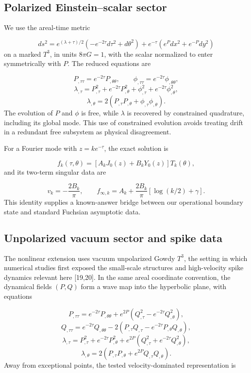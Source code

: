 \documentclass{iopjournal}
\begin{document}
\subsection{Polarized Einstein--scalar sector}
We use the areal-time metric

\[
ds^2=e^{(\lambda+\tau)/2}
(-e^{-2\tau}d\tau^2+d\theta^2)
+e^{-\tau}(e^Pdx^2+e^{-P}dy^2)
\]
on a marked $T^3$, in units $8\pi G=1$, with the scalar normalized to enter symmetrically with $P$. The reduced equations are

\[
P_{,\tau\tau}=e^{-2\tau}P_{,\theta\theta},
\qquad
\phi_{,\tau\tau}=e^{-2\tau}\phi_{,\theta\theta},
\]
\[
\lambda_{,\tau}=P_{,\tau}^2+e^{-2\tau}P_{,\theta}^2
+\phi_{,\tau}^2+e^{-2\tau}\phi_{,\theta}^2,
\]
\[
\lambda_{,\theta}
=2(P_{,\tau}P_{,\theta}+\phi_{,\tau}\phi_{,\theta}).
\]
The evolution of $P$ and $\phi$ is free, while $\lambda$ is recovered by constrained quadrature, including its global mode. This use of constrained evolution avoids treating drift in a redundant free subsystem as physical disagreement.

For a Fourier mode with $z=ke^{-\tau}$, the exact solution is

\[
f_k(\tau,\theta)=
[A_kJ_0(z)+B_kY_0(z)]T_k(\theta),
\]
and its two-term singular data are

\[
v_k=-\frac{2B_k}{\pi},
\qquad
f_{\infty,k}=A_k+\frac{2B_k}{\pi}
[\log(k/2)+\gamma].
\]
This identity supplies a known-answer bridge between our operational boundary state and standard Fuchsian asymptotic data.

\subsection{Unpolarized vacuum sector and spike data}
The nonlinear extension uses vacuum unpolarized Gowdy $T^3$, the setting in which numerical studies first exposed the small-scale structures and high-velocity spike dynamics relevant here [19,20]. In the same areal coordinate convention, the dynamical fields $(P,Q)$ form a wave map into the hyperbolic plane, with equations

\[
P_{,\tau\tau}=e^{-2\tau}P_{,\theta\theta}
+e^{2P}\left(Q_{,\tau}^2-e^{-2\tau}Q_{,\theta}^2\right),
\]
\[
Q_{,\tau\tau}=e^{-2\tau}Q_{,\theta\theta}
-2\left(P_{,\tau}Q_{,\tau}-e^{-2\tau}P_{,\theta}Q_{,\theta}\right),
\]
\[
\lambda_{,\tau}=P_{,\tau}^2+e^{-2\tau}P_{,\theta}^2
+e^{2P}\left(Q_{,\tau}^2+e^{-2\tau}Q_{,\theta}^2\right),
\]
\[
\lambda_{,\theta}=2\left(P_{,\tau}P_{,\theta}
+e^{2P}Q_{,\tau}Q_{,\theta}\right).
\]
Away from exceptional points, the tested velocity-dominated representation is
\end{document}
